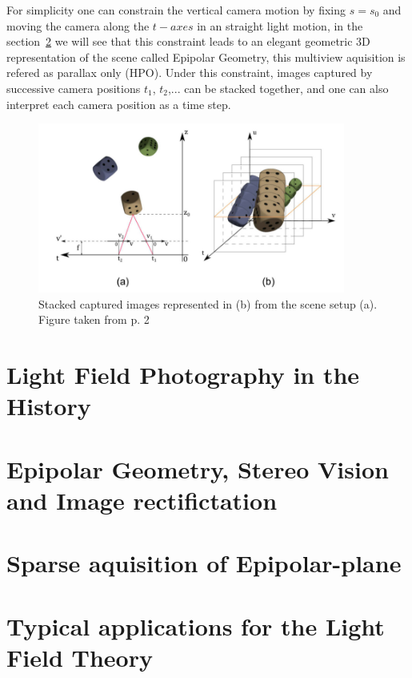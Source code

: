 For simplicity one can constrain the vertical camera motion by fixing $s = s_0$ and moving the camera along the $t-axes$ in an straight light motion, in the section~\ref{sec:Epi-geometry} we will see that this constraint leads to an elegant geometric 3D representation of the scene called Epipolar Geometry, this multiview aquisition is refered as parallax only (HPO). Under this constraint, images captured by successive camera positions $t_1$, $t_2$,... can be stacked together, and one can also interpret each camera position as a time step.

\begin{figure}[h!]
\centering
\includegraphics[width= 0.90\textwidth]{./Diagrams/images_stacked.jpg}
\caption{Stacked captured images represented in (b) from the scene setup (a). Figure taken from \cite{LF-Shearlets} p. 2}
\end{figure}

\section{Light Field Photography in the History}



\section{Epipolar Geometry, Stereo Vision and Image rectifictation}
\label{sec:Epi-geometry}

\section{Sparse aquisition of Epipolar-plane}

\section{Typical applications for the Light Field Theory}
